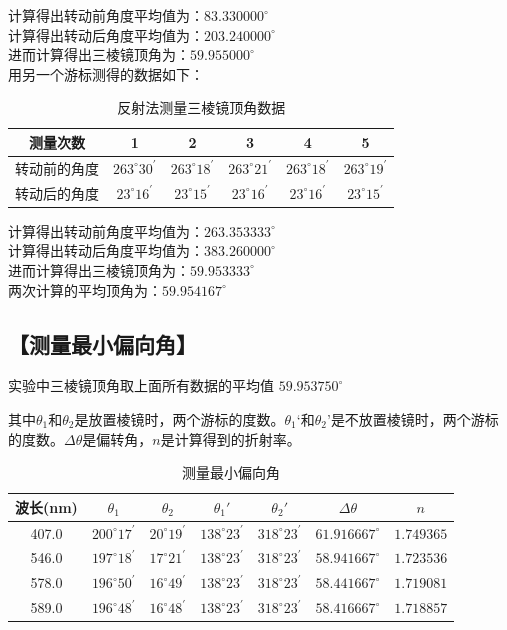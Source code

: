 \documentclass{ctexart}
\let\oldsubsection\subsection
\renewcommand{\subsection}[1]{\oldsubsection{\!\!\!\!\!\!【#1】}}
\begin{document}
计算得出转动前角度平均值为：$83.330000^\circ$ \\
计算得出转动后角度平均值为：$203.240000^\circ$ \\
进而计算得出三棱镜顶角为：$59.955000^\circ$ \\

用另一个游标测得的数据如下：

\begin{table}[H]
  \centering
  \begin{tabular}{|c|c|c|c|c|c|}
    \hline
     测量次数           & 1 & 2 & 3 & 4 & 5 \\\hline
     转动前的角度 &$263^\circ 30^\prime$&$263^\circ 18^\prime$&$263^\circ 21^\prime$&$263^\circ 18^\prime$&$263^\circ 19^\prime$\\\hline
     转动后的角度 &$23^\circ 16^\prime$&$23^\circ 15^\prime$&$23^\circ 16^\prime$&$23^\circ 16^\prime$&$23^\circ 15^\prime$\\\hline
  \end{tabular}
  \caption{反射法测量三棱镜顶角数据}
\end{table}

计算得出转动前角度平均值为：$263.353333^\circ$ \\
计算得出转动后角度平均值为：$383.260000^\circ$ \\
进而计算得出三棱镜顶角为：$59.953333^\circ$ \\
两次计算的平均顶角为：$59.954167^\circ$

\subsection{测量最小偏向角}

实验中三棱镜顶角取上面所有数据的平均值 $59.953750^\circ$

其中$\theta_1$和$\theta_2$是放置棱镜时，两个游标的度数。$\theta_1‘$和$\theta_2’$是不放置棱镜时，两个游标的度数。$\Delta \theta$是偏转角，$n$是计算得到的折射率。

\begin{table}[H]
  \centering
  \begin{tabular}{|c|c|c|c|c|c|c|}
    \hline
     波长(nm) & $\theta_1$ & $\theta_2$ & $\theta_1'$ & $\theta_2'$ & $\Delta \theta$ & $n$\\\hline
    407.0&$200^\circ17^\prime$ &$20^\circ19^\prime$ &$138^\circ23^\prime$ &$318^\circ23^\prime$ &$61.916667^\circ$ &$1.749365$\\\hline
    546.0&$197^\circ18^\prime$ &$17^\circ21^\prime$ &$138^\circ23^\prime$ &$318^\circ23^\prime$ &$58.941667^\circ$ &$1.723536$\\\hline
    578.0&$196^\circ50^\prime$ &$16^\circ49^\prime$ &$138^\circ23^\prime$ &$318^\circ23^\prime$ &$58.441667^\circ$ &$1.719081$\\\hline
    589.0&$196^\circ48^\prime$ &$16^\circ48^\prime$ &$138^\circ23^\prime$ &$318^\circ23^\prime$ &$58.416667^\circ$ &$1.718857$\\\hline
  \end{tabular}
  \caption{测量最小偏向角}
\end{table}
\end{document}
